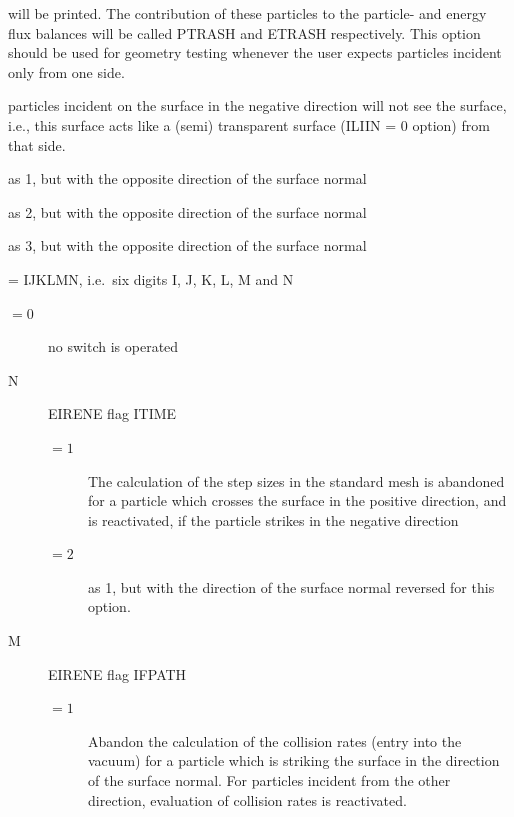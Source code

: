 \begin{description}
\begin{description}
                will be printed.
                The contribution of these particles to the particle- and energy flux balances
                will be called PTRASH and ETRASH respectively.
                This option should be used for geometry testing whenever the user expects
                particles incident only from one side.
          \item[$= 3$] particles incident on the surface in the negative direction will
                not see the surface, i.e., this surface acts like a (semi) transparent surface
                (ILIIN = 0 option) from that side.
          \item[$= -1$] as 1, but with the opposite direction of the surface normal
          \item[$= -2$] as 2, but with the opposite direction of the surface normal
          \item[$= -3$] as 3, but with the opposite direction of the surface normal
        \end{description}
  \item[ILSWCH] = IJKLMN, i.e.\ six digits I, J, K, L, M and N
        \begin{description}
          \item[$= 0$] no switch is operated
          \item[N] EIRENE flag
                ITIME
                \begin{description}
                  \item[$= 1$] The calculation of the step sizes in the
                        standard mesh is abandoned for a particle which crosses the surface in the
                        positive direction, and is reactivated, if the particle strikes in the negative
                        direction
                  \item[$= 2$] as 1, but with the direction of the surface normal
                        reversed for this option.
                \end{description}
          \item[M] EIRENE flag IFPATH
                \begin{description}
                  \item[$= 1$] Abandon the
                        calculation of the collision rates (entry into the vacuum) for a particle which
                        is striking the surface in the direction of the surface normal.
                        For particles incident from the other direction, evaluation of collision rates
                        is reactivated.

\end{description}
\end{description}
\end{description}
